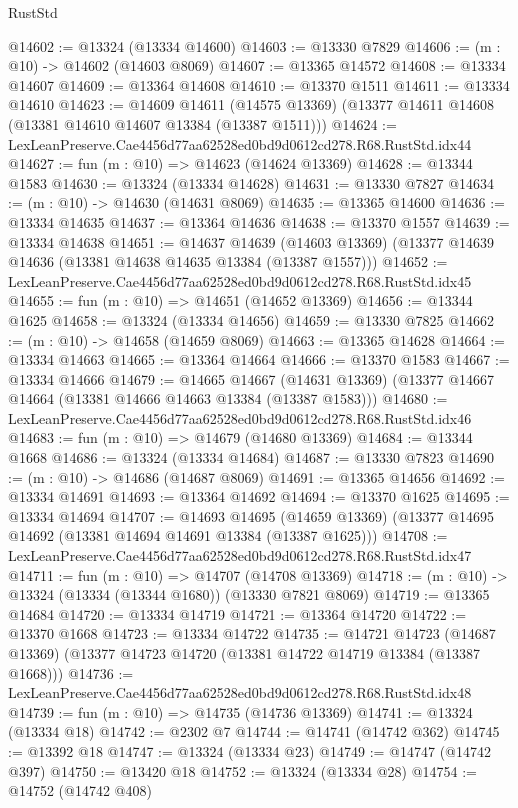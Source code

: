 \begin{lexlean}{RustStd}
\begin{coremodule}
@14602 := @13324 (@13334 @14600)
@14603 := @13330 @7829
@14606 := (m : @10) -> @14602 (@14603 @8069)
@14607 := @13365 @14572
@14608 := @13334 @14607
@14609 := @13364 @14608
@14610 := @13370 @1511
@14611 := @13334 @14610
@14623 := @14609
    @14611
    (@14575 @13369)
    (@13377 @14611 @14608 (@13381 @14610 @14607 @13384 (@13387 @1511)))
@14624 := LexLeanPreserve.Cae4456d77aa62528ed0bd9d0612cd278.R68.RustStd.idx44
@14627 := fun (m : @10) => @14623 (@14624 @13369)
@14628 := @13344 @1583
@14630 := @13324 (@13334 @14628)
@14631 := @13330 @7827
@14634 := (m : @10) -> @14630 (@14631 @8069)
@14635 := @13365 @14600
@14636 := @13334 @14635
@14637 := @13364 @14636
@14638 := @13370 @1557
@14639 := @13334 @14638
@14651 := @14637
    @14639
    (@14603 @13369)
    (@13377 @14639 @14636 (@13381 @14638 @14635 @13384 (@13387 @1557)))
@14652 := LexLeanPreserve.Cae4456d77aa62528ed0bd9d0612cd278.R68.RustStd.idx45
@14655 := fun (m : @10) => @14651 (@14652 @13369)
@14656 := @13344 @1625
@14658 := @13324 (@13334 @14656)
@14659 := @13330 @7825
@14662 := (m : @10) -> @14658 (@14659 @8069)
@14663 := @13365 @14628
@14664 := @13334 @14663
@14665 := @13364 @14664
@14666 := @13370 @1583
@14667 := @13334 @14666
@14679 := @14665
    @14667
    (@14631 @13369)
    (@13377 @14667 @14664 (@13381 @14666 @14663 @13384 (@13387 @1583)))
@14680 := LexLeanPreserve.Cae4456d77aa62528ed0bd9d0612cd278.R68.RustStd.idx46
@14683 := fun (m : @10) => @14679 (@14680 @13369)
@14684 := @13344 @1668
@14686 := @13324 (@13334 @14684)
@14687 := @13330 @7823
@14690 := (m : @10) -> @14686 (@14687 @8069)
@14691 := @13365 @14656
@14692 := @13334 @14691
@14693 := @13364 @14692
@14694 := @13370 @1625
@14695 := @13334 @14694
@14707 := @14693
    @14695
    (@14659 @13369)
    (@13377 @14695 @14692 (@13381 @14694 @14691 @13384 (@13387 @1625)))
@14708 := LexLeanPreserve.Cae4456d77aa62528ed0bd9d0612cd278.R68.RustStd.idx47
@14711 := fun (m : @10) => @14707 (@14708 @13369)
@14718 := (m : @10) -> @13324 (@13334 (@13344 @1680)) (@13330 @7821 @8069)
@14719 := @13365 @14684
@14720 := @13334 @14719
@14721 := @13364 @14720
@14722 := @13370 @1668
@14723 := @13334 @14722
@14735 := @14721
    @14723
    (@14687 @13369)
    (@13377 @14723 @14720 (@13381 @14722 @14719 @13384 (@13387 @1668)))
@14736 := LexLeanPreserve.Cae4456d77aa62528ed0bd9d0612cd278.R68.RustStd.idx48
@14739 := fun (m : @10) => @14735 (@14736 @13369)
@14741 := @13324 (@13334 @18)
@14742 := @2302 @7
@14744 := @14741 (@14742 @362)
@14745 := @13392 @18
@14747 := @13324 (@13334 @23)
@14749 := @14747 (@14742 @397)
@14750 := @13420 @18
@14752 := @13324 (@13334 @28)
@14754 := @14752 (@14742 @408)

\end{coremodule}
\end{lexlean}
